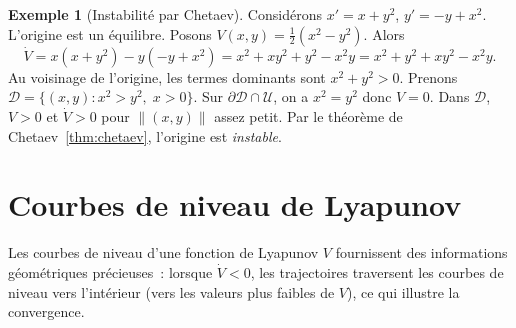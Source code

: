 \documentclass[12pt,a4paper,openany]{book}
\theoremstyle{definition}
\newtheorem{exemple}[definition]{Exemple}
\theoremstyle{plain}
\theoremstyle{remark}
\newcommand{\norm}[1]{\left\|#1\right\|}
\begin{document}
\begin{exemple}[Instabilité par Chetaev]\label{ex:chetaev}
  Considérons $x'=x+y^2$, $y'=-y+x^2$. L'origine est un équilibre.
  Posons $V(x,y)=\frac{1}{2}(x^2-y^2)$. Alors
  \[
    \dot{V}=x(x+y^2)-y(-y+x^2)=x^2+xy^2+y^2-x^2y=x^2+y^2+xy^2-x^2y.
  \]
  Au voisinage de l'origine, les termes dominants sont $x^2+y^2>0$.
  Prenons $\mathcal{D}=\{(x,y):x^2>y^2,\;x>0\}$. Sur
  $\partial\mathcal{D}\cap\mathcal{U}$, on a $x^2=y^2$ donc $V=0$.
  Dans $\mathcal{D}$, $V>0$ et $\dot{V}>0$ pour $\norm{(x,y)}$ assez
  petit. Par le théorème de Chetaev~\ref{thm:chetaev}, l'origine est
  \emph{instable}.
\end{exemple}

\section{Courbes de niveau de Lyapunov}\label{sec:courbes-lyapunov}


Les courbes de niveau d'une fonction de Lyapunov $V$ fournissent des
informations géométriques précieuses~: lorsque $\dot{V}<0$, les
trajectoires traversent les courbes de niveau vers l'intérieur (vers
les valeurs plus faibles de $V$), ce qui illustre la convergence.

\begin{center}
\end{center}

\end{document}
